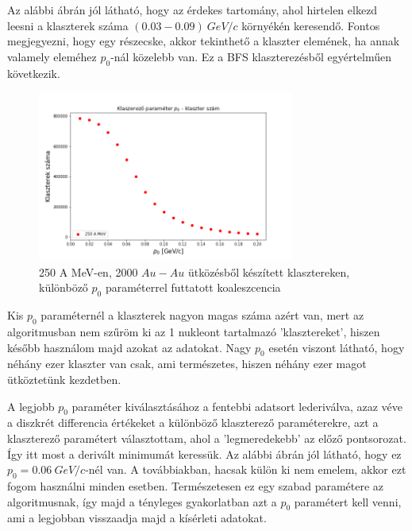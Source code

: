 \documentclass[a4paper,12pt]{article}
\begin{document}
\vspace{5mm}

\par Az alábbi ábrán jól látható, hogy az érdekes tartomány, ahol hirtelen elkezd leesni a klaszterek száma $(0.03 - 0.09) ~GeV/c$ környékén keresendő. Fontos megjegyezni, hogy egy részecske, akkor tekinthető a klaszter elemének, ha annak valamely eleméhez $p_{0}$-nál közelebb van. Ez a BFS klaszterezésből egyértelműen következik. 

\vspace{5mm}

\begin{figure}[H]
\centering
\includegraphics[width=0.75\textwidth]{./klaszterszamparameter.png}
\caption{250 A MeV-en, 2000 $Au-Au$ ütközésből készített klasztereken, különböző $p_{0}$ paraméterrel futtatott koaleszcencia}
\end{figure}

\vspace{5mm}

\par Kis $p_{0}$ paraméternél a klaszterek nagyon magas száma azért van, mert az algoritmusban nem szűröm ki az 1 nukleont tartalmazó 'klasztereket', hiszen később használom majd azokat az adatokat. Nagy $p_{0}$ esetén viszont látható, hogy néhány ezer klaszter van csak, ami természetes, hiszen néhány ezer magot ütköztetünk kezdetben.

\vspace{5mm}

\par A legjobb $p_{0}$ paraméter kiválasztásához a fentebbi adatsort lederiválva, azaz véve a diszkrét differencia értékeket a különböző klaszterező paraméterekre, azt a klaszterező paramétert választottam, ahol a 'legmeredekebb' az előző pontsorozat. Így itt most a derivált minimumát keressük. Az alábbi ábrán jól látható, hogy ez $p_{0} = 0.06 ~GeV/c$-nél van. A továbbiakban, hacsak külön ki nem emelem, akkor ezt fogom használni minden esetben. Természetesen ez egy szabad paramétere az algoritmusnak, így majd a tényleges gyakorlatban azt a $p_{0}$ paramétert kell venni, ami a legjobban visszaadja majd a kísérleti adatokat.
\end{document}
